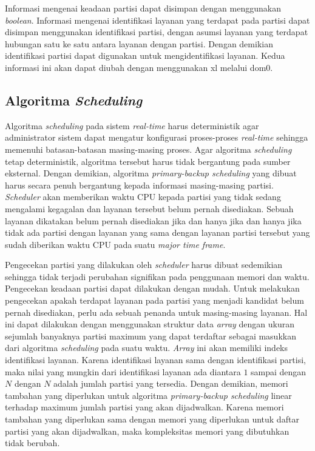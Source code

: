 Informasi mengenai keadaan partisi dapat disimpan dengan menggunakan \textit{boolean}. Informasi
mengenai identifikasi layanan yang terdapat pada partisi dapat disimpan menggunakan identifikasi
partisi, dengan asumsi layanan yang terdapat hubungan satu ke satu antara layanan dengan
partisi. Dengan demikian identifikasi partisi dapat digunakan untuk mengidentifikasi layanan.
Kedua informasi ini akan dapat diubah dengan menggunakan xl melalui dom0.

\subsection{Algoritma \textit{Scheduling}}
\label{section:algoritma_scheduling}

Algoritma \textit{scheduling} pada sistem \textit{real-time} harus deterministik agar
administrator sistem dapat mengatur konfigurasi proses-proses \textit{real-time} sehingga
memenuhi batasan-batasan masing-masing proses. Agar algoritma \textit{scheduling} tetap
deterministik, algoritma tersebut harus tidak bergantung pada sumber eksternal. Dengan demikian,
algoritma \textit{primary-backup scheduling} yang dibuat harus secara penuh bergantung kepada
informasi masing-masing partisi. \textit{Scheduler} akan memberikan waktu CPU kepada partisi
yang tidak sedang mengalami kegagalan dan layanan tersebut belum pernah
disediakan. Sebuah layanan dikatakan belum pernah disediakan jika dan hanya jika dan
hanya jika tidak ada partisi dengan layanan yang sama dengan layanan partisi
tersebut yang sudah diberikan waktu CPU pada suatu \textit{major time frame}.

Pengecekan partisi yang dilakukan oleh \textit{scheduler} harus dibuat sedemikian sehingga tidak
terjadi perubahan signifikan pada penggunaan memori dan waktu. Pengecekan keadaan partisi dapat
dilakukan dengan mudah. Untuk melakukan pengecekan apakah terdapat layanan pada partisi
yang menjadi kandidat belum pernah disediakan, perlu ada sebuah penanda untuk masing-masing
layanan. Hal ini dapat dilakukan dengan menggunakan struktur data \textit{array} dengan
ukuran sejumlah banyaknya partisi maximum yang dapat terdaftar sebagai masukkan dari algoritma
\textit{scheduling} pada suatu waktu. \textit{Array} ini akan memiliki indeks identifikasi
layanan. Karena identifikasi layanan sama dengan identifikasi partisi, maka
nilai yang mungkin dari identifikasi layanan ada diantara $1$ sampai dengan $N$ dengan
$N$ adalah jumlah partisi yang tersedia. Dengan demikian, memori tambahan yang diperlukan untuk
algoritma \textit{primary-backup scheduling} linear terhadap maximum jumlah partisi yang akan
dijadwalkan. Karena memori tambahan yang diperlukan sama dengan memori yang diperlukan untuk
daftar partisi yang akan dijadwalkan, maka kompleksitas memori yang dibutuhkan tidak berubah.

